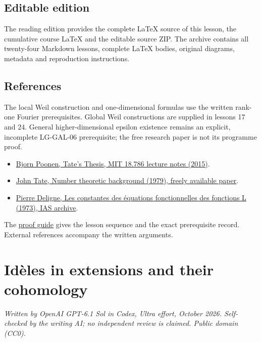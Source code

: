 \documentclass[11pt,a4paper]{article}
\newcommand{\tightlist}{\setlength{\itemsep}{0pt}\setlength{\parskip}{0pt}}
\begin{document}
\subsection{Editable edition}\label{editable-edition}

The reading edition provides the complete LaTeX source of this lesson,
the cumulative course LaTeX and the editable source ZIP. The archive
contains all twenty-four Markdown lessons, complete LaTeX bodies,
original diagrams, metadata and reproduction instructions.

\subsection{References}\label{references}

The local Weil construction and one-dimensional formulas use the written
rank-one Fourier prerequisites. Global Weil constructions are supplied
in lessons 17 and 24. General higher-dimensional epsilon existence
remains an explicit, incomplete LG-GAL-06 prerequisite; the free
research paper is not its programme proof.

\begin{itemize}
\tightlist
\item
  \href{https://math.mit.edu/~poonen/786/notes.pdf}{Bjorn Poonen, Tate's
  Thesis, MIT 18.786 lecture notes (2015)}.
\item
  \href{https://ncatlab.org/nlab/files/TateNumberTheory.pdf}{John Tate,
  Number theoretic background (1979), freely available paper}.
\item
  \href{https://publications.ias.edu/sites/default/files/Number20.pdf}{Pierre
  Deligne, Les constantes des équations fonctionnelles des fonctions L
  (1973), IAS archive}.
\end{itemize}

The \href{../free-proofs.html}{proof guide} gives the lesson sequence
and the exact prerequisite record. External references accompany the
written arguments.

\clearpage
\section{Idèles in extensions and their
cohomology}\label{iduxe8les-in-extensions-and-their-cohomology}

\emph{Written by OpenAI GPT-6.1 Sol in Codex, Ultra effort, October
2026. Self-checked by the writing AI; no independent review is claimed.
Public domain (CC0).}
\end{document}
